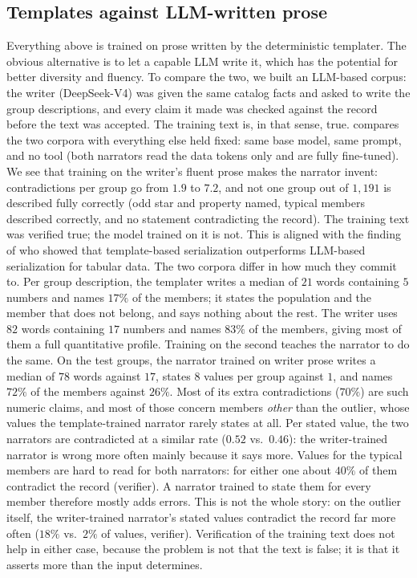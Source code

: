 \subsection{Templates against LLM-written prose}\label{app:corpus}
Everything above is trained on prose written by the deterministic templater.
The obvious alternative is to let a capable LLM write it, which has the potential for better diversity and fluency. To compare the two, we built an LLM-based corpus: the writer (DeepSeek-V4) was given the same
catalog facts and asked to write the group descriptions, and every claim it made
was checked against the record before the text was accepted. The training text
is, in that sense, true.  compares the two corpora with
everything else held fixed: same base model, same prompt, and no tool (both narrators read the data tokens only and are fully fine-tuned). We see that training on the writer's fluent prose makes the narrator invent:
contradictions per group go from $1.9$ to $7.2$, and not one group out of
$1{,}191$ is described fully correctly (odd star and property named, typical members described correctly, and no statement contradicting the record). The training text was verified true; the
model trained on it is not. This is aligned with the finding of \cite{Hegselmann2022TabLLMFC} who showed that template-based serialization outperforms LLM-based serialization for tabular data. The two corpora differ in how much they commit to. Per group description, the
templater writes a median of $21$ words containing $5$ numbers and names $17\%$
of the members; it states the population and the member that does not belong,
and says nothing about the rest. The writer uses $82$ words containing $17$
numbers and names $83\%$ of the members, giving most of them a full quantitative
profile. Training on the second teaches the narrator to do the same. On the test groups,
the narrator trained on writer prose writes a median of $78$ words against $17$, states
$8$ values per group against $1$, and names $72\%$ of the members against
$26\%$. Most of its extra contradictions ($70\%$) are such numeric claims, and
most of those concern members \emph{other} than the outlier, whose values the
template-trained narrator rarely states at all. Per stated value, the two narrators are
contradicted at a similar rate ($0.52$ vs.\ $0.46$): the writer-trained narrator is
wrong more often mainly because it says more. Values for the typical members are hard to read
for both narrators: for either one about $40\%$ of them contradict the record
(verifier). A narrator trained to state them for every member therefore
mostly adds errors. This is not the whole story: on the outlier itself, the writer-trained
narrator's stated values contradict the record far more often ($18\%$ vs.\ $2\%$ of
values, verifier). Verification of the training text does not help in either
case, because the problem is not that the text is false; it is that it asserts
more than the input determines.

